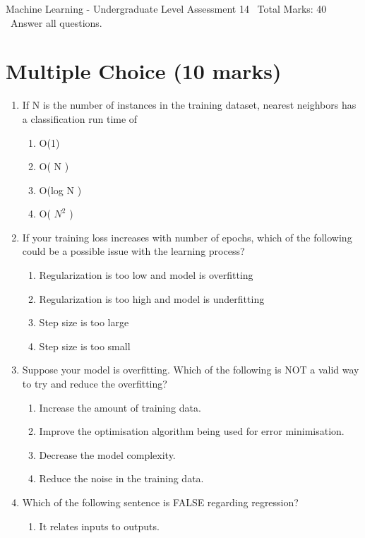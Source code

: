 \documentclass[12pt]{article}
\begin{document}
\begin{center}
Machine Learning - Undergraduate Level Assessment 14 \
Total Marks: 40 \
Answer all questions.
\end{center}

\section*{Multiple Choice (10 marks)}
\begin{enumerate}[label=\arabic*.]
\item If N is the number of instances in the training dataset, nearest neighbors has a classification run time of
\begin{enumerate}[label=(\alph*)]
    \item O(1)
    \item O( N )
    \item O(log N )
    \item O( $N^2$ )
\end{enumerate}
\item If your training loss increases with number of epochs, which of the following could be a possible issue with the learning process?
\begin{enumerate}[label=(\alph*)]
    \item Regularization is too low and model is overfitting
    \item Regularization is too high and model is underfitting
    \item Step size is too large
    \item Step size is too small
\end{enumerate}
\item Suppose your model is overfitting. Which of the following is NOT a valid way to try and reduce the overfitting?
\begin{enumerate}[label=(\alph*)]
    \item Increase the amount of training data.
    \item Improve the optimisation algorithm being used for error minimisation.
    \item Decrease the model complexity.
    \item Reduce the noise in the training data.
\end{enumerate}
\item Which of the following sentence is FALSE regarding regression?
\begin{enumerate}[label=(\alph*)]
    \item It relates inputs to outputs.

\end{enumerate}
\end{enumerate}
\end{document}
